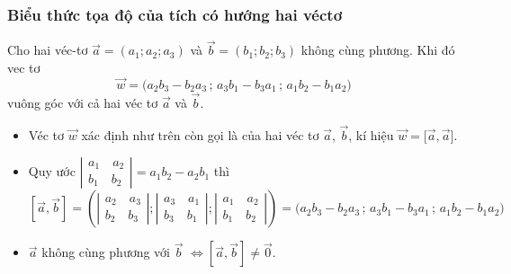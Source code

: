 \subsubsection{Biểu thức tọa độ của tích có hướng hai véctơ}
Cho hai véc-tơ $\vec{a}=(a_1;a_2;a_3)$ và $\vec{b}=(b_1;b_2;b_3)$ không cùng phương. Khi đó vec tơ $$\vec{w}=\bigg(a_2b_3-b_2a_3\,;\,a_3b_1-b_3a_1\,;\,a_1b_2-b_1a_2 \bigg)$$ vuông góc với cả hai véc tơ $\vec{a}$ và $\vec{b}$.
\begin{luuy}
	\begin{itemize}
		\item [\ding{172}] Véc tơ $\vec{w}$ xác định như trên còn gọi là  của hai véc tơ $\vec{a}$, $\vec{b}$, kí hiệu  $\vec{w}=\big[\vec{a},\vec{a}\big]$.
		\item [\ding{173}] Quy ước $\left|\begin{array}{l}
			{a_1}\quad{a_2}\\
			{b_1}\quad{b_2}
		\end{array}\right|=a_1b_2-a_2b_1$ thì
		$$\left[\vec a ,\vec b\right]=\left(\left|\begin{array}{l}
			{a_2}\quad{a_3}\\
			{b_2}\quad{b_3}
		\end{array}\right|;\left|\begin{array}{l}
			{a_3}\quad {a_1}\\
			{b_3}\quad{b_1}
		\end{array}\right|;\left|\begin{array}{l}
			{a_1}\quad{a_2}\\
			{b_1}\quad{b_2}
		\end{array}\right|\right)=\bigg(a_2b_3-b_2a_3\,;\,a_3b_1-b_3a_1\,;\,a_1b_2-b_1a_2 \bigg) $$
		\item [\ding{174}] $\vec{a}$ không cùng phương với $\vec{b}$ $\Leftrightarrow \left[\vec a ,\vec b\right] \ne \vec{0}$.
	\end{itemize}
\end{luuy}
